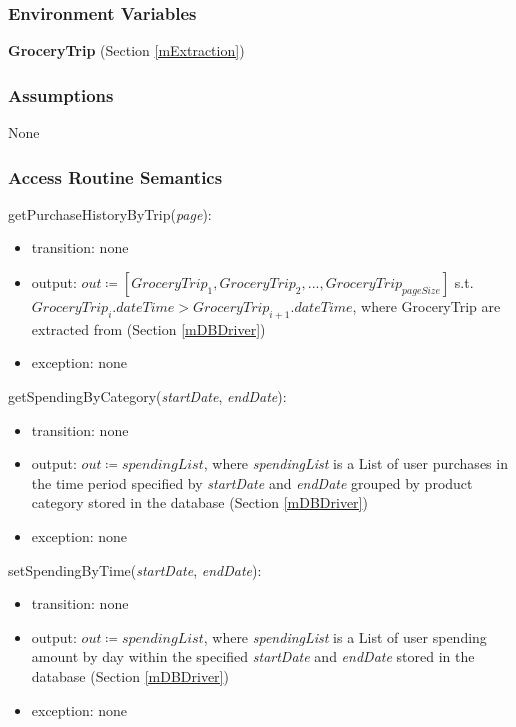 \documentclass[12pt, titlepage]{article}
\begin{document}
\subsubsection{Environment Variables}
\textbf{GroceryTrip} (Section \ref{mExtraction})


\subsubsection{Assumptions}
None

\subsubsection{Access Routine Semantics}

\noindent getPurchaseHistoryByTrip(\textit{page}):
\begin{itemize}
\item transition: none
\item output: $\textit{out} \coloneqq [GroceryTrip_{1}, GroceryTrip_{2},..., GroceryTrip_{pageSize}]$ s.t. \\ $GroceryTrip_{i}.dateTime > GroceryTrip_{i+1}.dateTime$, where GroceryTrip are extracted from (Section \ref{mDBDriver})
\item exception: none
\end{itemize}

\noindent getSpendingByCategory(\textit{startDate}, \textit{endDate}):
\begin{itemize}
\item transition: none
\item output: \( \textit{out} \coloneqq spendingList \), where \textit{spendingList} is a List of user purchases in the time period specified by \textit{startDate} and \textit{endDate} grouped by product category stored in the database (Section \ref{mDBDriver})
\item exception: none
\end{itemize}

\noindent setSpendingByTime(\textit{startDate}, \textit{endDate}):
\begin{itemize}
\item transition: none
\item output: \( \textit{out} \coloneqq spendingList \), where \textit{spendingList} is a List of user spending amount by day within the specified \textit{startDate} and \textit{endDate} stored in the database (Section \ref{mDBDriver})
\item exception: none
\end{itemize}
\end{document}
